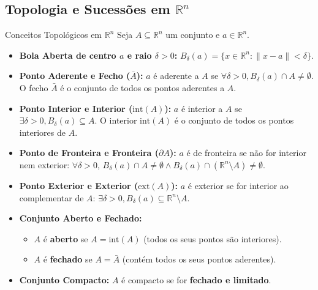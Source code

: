 \documentclass[11pt,a4paper]{article}
\newcommand{\R}{\mathbb{R}}
\begin{document}
\subsection{Topologia e Sucessões em \texorpdfstring{$\R^n$}{R\textasciicircum n}}

\begin{minipage}[t]{0.65\textwidth}
  \begin{definitionbox}{Conceitos Topológicos em $\R^n$}
    Seja $A \subseteq \R^n$ um conjunto e $a \in \R^n$.
    \begin{itemize}
      \item \textbf{Bola Aberta de centro $a$ e raio $\delta > 0$:} $B_\delta(a) = \{x \in \R^n : \|x - a\| < \delta\}$.
      \item \textbf{Ponto Aderente e Fecho ($\bar{A}$):} $a$ é aderente a $A$ se $\forall \delta > 0, B_\delta(a) \cap A \neq \emptyset$. O fecho $\bar{A}$ é o conjunto de todos os pontos aderentes a $A$.
      \item \textbf{Ponto Interior e Interior ($\text{int}(A)$):} $a$ é interior a $A$ se $\exists \delta > 0, B_\delta(a) \subseteq A$. O interior $\text{int}(A)$ é o conjunto de todos os pontos interiores de $A$.
      \item \textbf{Ponto de Fronteira e Fronteira ($\partial A$):} $a$ é de fronteira se não for interior nem exterior: $\forall \delta > 0$, $B_\delta(a) \cap A \neq \emptyset \wedge B_\delta(a) \cap (\R^n \setminus A) \neq \emptyset$.
      \item \textbf{Ponto Exterior e Exterior ($\text{ext}(A)$):} $a$ é exterior se for interior ao complementar de $A$: $\exists \delta > 0, B_\delta(a) \subseteq \R^n \setminus A$.
      \item \textbf{Conjunto Aberto e Fechado:}
        \begin{itemize}
          \item $A$ é \textbf{aberto} se $A = \text{int}(A)$ (todos os seus pontos são interiores).
          \item $A$ é \textbf{fechado} se $A = \bar{A}$ (contém todos os seus pontos aderentes).
        \end{itemize}
      \item \textbf{Conjunto Compacto:} $A$ é compacto se for \textbf{fechado e limitado}.
    \end{itemize}
  \end{definitionbox}
\end{minipage}%
\hfill
\end{document}
